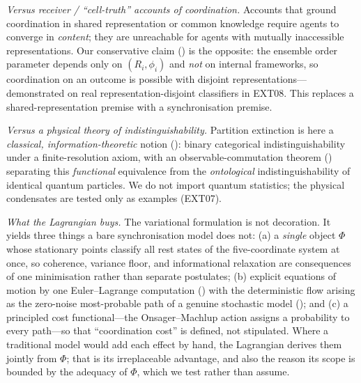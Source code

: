 \documentclass[11pt,twocolumn,a4paper]{article}
\newcommand{\Pot}{\Phi}
\newcommand{\Ord}{R}
\begin{document}
\emph{Versus receiver / ``cell-truth'' accounts of coordination.} Accounts that
ground coordination in shared representation or common knowledge require agents
to converge in \emph{content}; they are unreachable for agents with mutually
inaccessible representations. Our conservative claim
() is the opposite: the ensemble order parameter depends only
on $(\Ord_i,\phi_i)$ and \emph{not} on internal frameworks, so coordination on an
outcome is possible with disjoint representations---demonstrated on real
representation-disjoint classifiers in EXT08. This replaces a
shared-representation premise with a synchronisation premise.

\emph{Versus a physical theory of indistinguishability.} Partition extinction is
here a \emph{classical, information-theoretic} notion ():
binary categorical indistinguishability under a finite-resolution axiom, with an
observable-commutation theorem () separating this
\emph{functional} equivalence from the \emph{ontological} indistinguishability of
identical quantum particles. We do not import quantum statistics; the physical
condensates are tested only as examples (EXT07).

\emph{What the Lagrangian buys.} The variational formulation is not decoration.
It yields three things a bare synchronisation model does not: (a) a
\emph{single} object $\Pot$ whose stationary points classify all rest states of
the five-coordinate system at once, so coherence, variance floor, and
informational relaxation are consequences of one minimisation rather than
separate postulates; (b) explicit equations of motion by one
Euler--Lagrange computation () with the deterministic flow arising
as the zero-noise most-probable path of a genuine stochastic model
(); and (c) a principled cost functional---the
Onsager--Machlup action assigns a probability to every path---so that
``coordination cost'' is defined, not stipulated. Where a traditional model would
add each effect by hand, the Lagrangian derives them jointly from $\Pot$; that
is its irreplaceable advantage, and also the reason its scope is bounded by the
adequacy of $\Pot$, which we test rather than assume.
\end{document}
